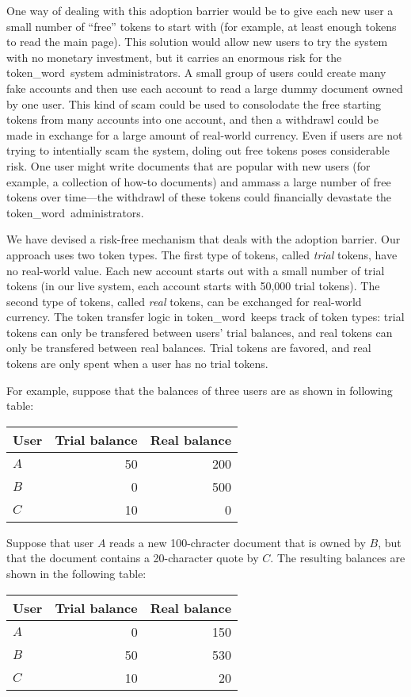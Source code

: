 \documentclass{acm_proc_article-sp}
\newcommand{\tw}{token\_word}
\begin{document}
One way of dealing with this adoption barrier would be to give each new user a small number of ``free'' tokens to start with (for example, at least enough tokens to read the main page).
This solution would allow new users to try the system with no monetary investment, but it carries an enormous risk for the \tw \  system administrators.
A small group of users could create many fake accounts and then use each account to read a large dummy document owned by one user.
This kind of scam could be used to consolodate the free starting tokens from many accounts into one account, and then a withdrawl could be made in exchange for a large amount of real-world currency.
Even if users are not trying to intentially scam the system, doling out free tokens poses considerable risk.
One user might write documents that are popular with new users (for example, a collection of how-to documents) and ammass a large number of free tokens over time---the withdrawl of these tokens could financially devastate the \tw \  administrators.

We have devised a risk-free mechanism that deals with the adoption barrier.  
Our approach uses two token types.
The first type of tokens, called {\it trial} tokens, have no real-world value.
Each new account starts out with a small number of trial tokens (in our live system, each account starts with 50,000 trial tokens).
The second type of tokens, called {\it real} tokens, can be exchanged for real-world currency.
The token transfer logic in \tw \  keeps track of token types:  trial tokens can only be transfered between users' trial balances, and real tokens can only be transfered between real balances.
Trial tokens are favored, and real tokens are only spent when a user has no trial tokens.

For example, suppose that the balances of three users are as shown in following table:
\begin{center}
\begin{tabular}{|l||r|r|}
\hline
User&Trial balance &Real balance\\
\hline
$A$&50 &200\\
\hline
$B$&0  &500\\
\hline
$C$&10 &0  \\
\hline
\end{tabular}
\end{center}
Suppose that user $A$ reads a new 100-chracter document that is owned by $B$, but that the document contains a 20-character quote by $C$.
The resulting balances are shown in the following table:
\begin{center}
\begin{tabular}{|l||r|r|}
\hline
User&Trial balance &Real balance\\
\hline
$A$&0 &150\\
\hline
$B$&50  &530\\
\hline
$C$&10 &20  \\
\hline
\end{tabular}
\end{center}
\end{document}
